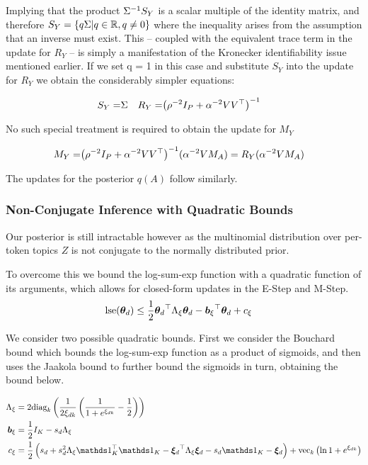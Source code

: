 Implying that the product ${\Sigma}^{-1} S_Y$ is a scalar multiple of the identity matrix, and therefore $S_Y = \{ q \Sigma | q \in { \mathbb{R} }, q \neq 0 \}$ where the inequality arises from the assumption that an inverse must exist. This -- coupled with the equivalent trace term in the update for $R_Y$ -- is simply a manifestation of the Kronecker identifiability issue mentioned earlier. If we set q = 1 in this case and substitute $S_Y$ into the update for $R_Y$ we obtain the considerably simpler equations:

\begin{align}
S_Y = & \Sigma &
R_Y = & {\left( \rho^{-2} I_P + \alpha^{-2}V V^\top \right)}^{-1}
\end{align}

No such special treatment is required to obtain the update for $M_Y$

\begin{align}
M_Y = & {\left( \rho^{-2} I_P + \alpha^{-2} V V^\top \right)}^{-1}(\alpha^{-2}V M_A) = R_Y (\alpha^{-2} V M_A)
\end{align}

The updates for the posterior $q(A)$ follow similarly.

\subsubsection{Non-Conjugate Inference with Quadratic Bounds}
Our posterior is still intractable however as the multinomial distribution over per-token topics $Z$ is not conjugate to the normally distributed prior.

To overcome this we bound the log-sum-exp function with a quadratic function of its arguments, which allows for closed-form updates in the E-Step and M-Step. 
\begin{align}
\text{lse}({ \bm \theta_d }) & \leq \frac{1}{2} { \bm \theta_d }^\top { \Lambda_{\xi} } {  \bm \theta _d } - { \bm b_{\xi} }^\top{  \bm \theta _d } + { c_{\xi} }
\end{align}

We consider two possible quadratic bounds. First we consider the Bouchard bound\cite{Bouchard2007} which bounds the log-sum-exp function as a product of sigmoids, and then uses the Jaakola bound\cite{Jaakkola1997} to further bound the sigmoids in turn, obtaining the bound below.

\begin{align}
\Axi & = 2 \text{diag}_k
    \left(
        \frac{1}{2\Edk}\left(\frac{1}{1 + e^{\Edk}} - \half\right)
    \right) \\
\bxi & = \half I_K - s_d \Axi \\
\cxi & = \half \left( s_d + s_d^2 \Axi \onek\T\onek - \Ed\T\Axi\Ed -  s_d \onek - \Ed\right) + \text{vec}_k\left({\ln 1+e^{\Edk}}\right)
\end{align} 

